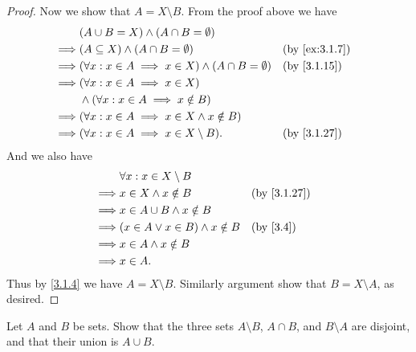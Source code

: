 \begin{proof}
  Now we show that \(A = X \setminus B\).
  From the proof above we have
  \begin{align*}
             & (A \cup B = X) \land (A \cap B = \emptyset)                                            \\
    \implies & (A \subseteq X) \land (A \cap B = \emptyset)                        &  & \by{ex:3.1.7} \\
    \implies & (\forall x : x \in A \implies x \in X) \land (A \cap B = \emptyset) &  & \by{3.1.15}   \\
    \implies & (\forall x : x \in A \implies x \in X)                                                 \\
             & \land (\forall x : x \in A \implies x \notin B)                                        \\
    \implies & (\forall x : x \in A \implies x \in X \land x \notin B)                                \\
    \implies & (\forall x : x \in A \implies x \in X \setminus B).                 &  & \by{3.1.27}
  \end{align*}
  And we also have
  \begin{align*}
             & \forall x : x \in X \setminus B                          \\
    \implies & x \in X \land x \notin B                &  & \by{3.1.27} \\
    \implies & x \in A \cup B \land x \notin B                          \\
    \implies & (x \in A \lor x \in B) \land x \notin B &  & \by{3.4}    \\
    \implies & x \in A \land x \notin B                                 \\
    \implies & x \in A.
  \end{align*}
  Thus by \cref{3.1.4} we have \(A = X \setminus B\).
  Similarly argument show that \(B = X \setminus A\), as desired.
\end{proof}

\begin{ex}\label{ex:3.1.10}
  Let \(A\) and \(B\) be sets.
  Show that the three sets \(A \setminus B\), \(A \cap B\), and \(B \setminus A\) are disjoint, and that their union is \(A \cup B\).
\end{ex}

